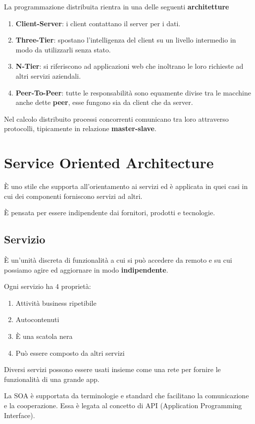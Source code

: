 \documentclass{report}
\begin{document}
\noindent
La programmazione distribuita rientra in una delle seguenti \textbf{architetture}
\begin{enumerate}
    \item \textbf{Client-Server}: i client contattano il server per i dati.
    \item \textbf{Three-Tier}: spostano l'intelligenza del client su un livello intermedio in modo da utilizzarli senza stato.
    \item \textbf{N-Tier}: si riferiscono ad applicazioni web che inoltrano le loro richieste ad altri servizi aziendali.
    \item \textbf{Peer-To-Peer}: tutte le responsabilità sono equamente divise tra le macchine anche dette \textbf{peer}, esse fungono sia da client che da server.
\end{enumerate}

\noindent
Nel calcolo distribuito processi concorrenti comunicano tra loro attraverso protocolli, tipicamente in relazione \textbf{master-slave}.

\section{Service Oriented Architecture}
\`E uno stile che supporta all'orientamento ai servizi ed è applicata in quei casi in cui dei componenti forniscono servizi ad altri.

\noindent
\`E pensata per essere indipendente dai fornitori, prodotti e tecnologie.

\subsection*{Servizio}
\`E un'unità discreta di funzionalità a cui si può accedere da remoto e su cui possiamo agire ed aggiornare in modo \textbf{indipendente}.

\noindent
Ogni servizio ha 4 proprietà:
\begin{enumerate}
    \item Attività business ripetibile
    \item Autocontenuti
    \item \`E una scatola nera
    \item Può essere composto da altri servizi
\end{enumerate}

\noindent
Diversi servizi possono essere usati insieme come una rete per fornire le funzionalità di una grande app.

\medskip
\noindent
La SOA è supportata da terminologie e standard che facilitano la comunicazione e la cooperazione. Essa è legata al concetto di API (Application Programming Interface).
\end{document}
